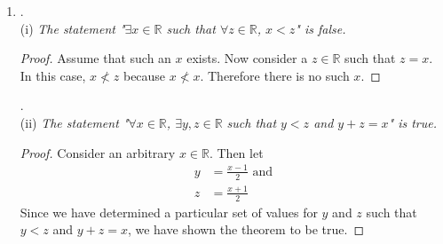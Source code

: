 \documentclass{amsart}
\begin{document}
\begin{enumerate}[1.]
\begin{proof}
Assume, for contradiction, that $|a - b| < \epsilon$ for all $\epsilon > 0$
and $a$ and $b$ are not equal. Then
\begin{align*}
    a &= b + c \text{ where $c\in\mathbb{R}$ and $c\neq 0$} \\
    a + (-b) &= (b + c) + (-b) \\
    a + (-b) &= b + (c + (-b)) &\text{ by associativity. } \\
    a + (-b) &= b + ((-b) + c) &\text{ by commutativity. } \\
    a + (-b) &= (b + (-b)) + c &\text{ by associativity. } \\ 
    a + (-b) &= 0 + c &\text{ by additive inverse. } \\
    a - b &= c &\text{ by additive identity. } \\
    |a - b| &= |c| \\
    |a - b| &= d \text{ where $d\in\mathbb{R^+}$} &\text{ by definition
    of absolute value. }
\end{align*}
Now consider $\epsilon = d/2$. We know that $\epsilon > 0$ because 
$d\in\mathbb{R^+}$ and $\mathbb{R^+}$ is closed under division.
But
\begin{align*}
    \frac{d}{2} < d \text{ as $\mathbb{R^+}$ is ordered. } \\
    \text{So } |a - b| = d \nless \frac{d}{2} = \epsilon.  \\
    \text{Thus } |a - b| \nless\epsilon \text{ for some $\epsilon > 0$.}
\end{align*}
This is a contradiction! Therefore $a$ and $b$ must be equal.
\end{proof}

\newpage


\item .\\
(i)\emph{ The statement "$\exists x\in\mathbb{R}$ such that $\forall z\in\mathbb{R}$, $x < z$" is false.}
\begin{proof}
Assume that such an $x$ exists. Now consider a $z\in\mathbb{R}$
such that $z = x$. In this case, $x \nless z$ because $ x \nless x$. 
Therefore there is no such $x$.
\end{proof}
.\\
(ii)\emph{ The statement "$\forall x\in\mathbb{R}$, $\exists y,z \in\mathbb{R}$ such that $y < z$ and $y+z = x$" is true.}
\begin{proof}
Consider an arbitrary $x\in\mathbb{R}$. Then let
\begin{align*}
    y &= \frac{x-1}{2}  \text{ and}\\
    z &= \frac{x+1}{2}
\end{align*}
Since we have determined a particular set of values for 
$y$ and $z$ such that $y < z$ and $y+z = x$, we have shown 
the theorem to be true.
\end{proof}


\end{enumerate}
\end{document}
